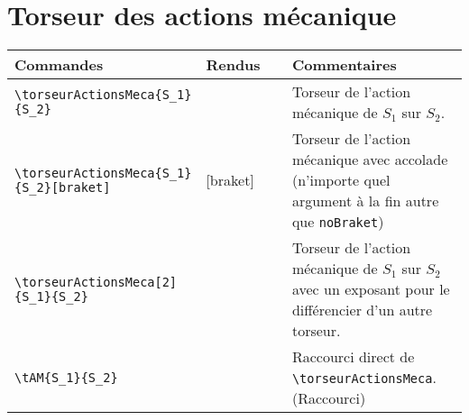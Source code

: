 \documentclass[a4paper,12pt]{article}
\newcommand{\rac}{({\color{red}Raccourci})}
\begin{document}
	\section{Torseur des actions mécanique}
		\noindent
		\begin{tabular}{|p{0.4\linewidth}|p{0.2\linewidth}|p{0.4\linewidth}|}
			\hline
				\textbf{Commandes}&\textbf{Rendus}&\textbf{Commentaires}
			\\\hline\hline
				\verb!\torseurActionsMeca{S_1}! \verb!{S_2}!		&	\torseurActionsMeca{S_1}{S_2}		&	Torseur de l'action mécanique de $S_1$ sur $S_2$.
			\\\hline
				\verb!\torseurActionsMeca{S_1}! \verb!{S_2}[braket]!		&	\torseurActionsMeca{S_1}{S_2}[braket]		&	Torseur de l'action mécanique avec accolade (n'importe quel argument à la fin autre que \verb!noBraket!)
			\\\hline
				\verb!\torseurActionsMeca[2]! \verb!{S_1}{S_2}!	&	\torseurActionsMeca[2]{S_1}{S_2}	&	Torseur de l'action mécanique de $S_1$ sur $S_2$ avec un exposant pour le différencier d'un autre torseur.
			\\\hline
				\verb!\tAM{S_1}{S_2}!					&	\tAM{S_1}{S_2}				&	Raccourci direct de \verb!\torseurActionsMeca!. \rac
			\\\hline
		\end{tabular}
\end{document}
